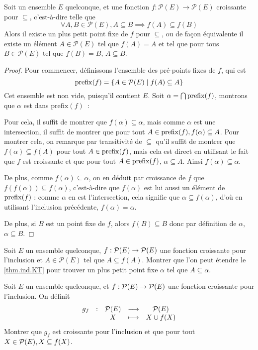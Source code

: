 \begin{theorem}\label{thm.ind.KT}
  Soit un ensemble $E$ quelconque, et une fonction
  $f : \mathcal P(E) \to \mathcal P(E)$ croissante pour $\subseteq$,
  c'est-à-dire telle que
  \[\forall A,B\in\mathcal P(E), A\subseteq B \implies f(A)\subseteq f(B)\]
  Alors il existe un plus petit point fixe de $f$ pour $\subseteq$, ou de façon
  équivalente il existe un élément $A\in \mathcal P(E)$ tel que $f(A)=A$ et tel
  que pour tous $B\in\mathcal P(E)$ tel que $f(B)=B$, $A\subseteq B$.
\end{theorem}
\begin{proof}
  Pour commencer, définissons l'ensemble des pré-points fixes de $f$, qui est
  \[\operatorname{prefix}(f) = \{ A \in \mathcal P(E)\mid f(A)\subseteq A\}\]
  Cet ensemble est non vide, puisqu'il contient $E$.
  Soit $\alpha = \bigcap \operatorname{prefix}(f)$, montrons que $\alpha$ est dans
  $\mathrm{prefix}(f)$~:

  Pour cela, il suffit de montrer que $f(\alpha)\subseteq \alpha$, mais comme
  $\alpha$ est une intersection, il suffit de montrer que pour tout
  $A\in\operatorname{prefix}(f), f(\alpha)\subseteq A$. Pour montrer cela, on
  remarque par transitivité de $\subseteq$ qu'il suffit de montrer que
  $f(\alpha)\subseteq f(A)$ pour tout $A\in \operatorname{prefix}(f)$, mais cela est
  direct en utilisant le fait que $f$ est croissante et que pour tout
  $A\in \operatorname{prefix}(f)$, $\alpha \subseteq A$. Ainsi
  $f(\alpha)\subseteq \alpha$.

  De plus, comme $f(\alpha)\subseteq \alpha$, on en déduit par croissance de
  $f$ que $f(f(\alpha))\subseteq f(\alpha)$, c'est-à-dire que $f(\alpha)$ est
  lui aussi un élément de $\operatorname{prefix}(f)$ : comme $\alpha$ en est l'intersection,
  cela signifie que $\alpha \subseteq f(\alpha)$, d'où en
  utilisant l'inclusion précédente, $f(\alpha) = \alpha$.

  De plus, si $B$ est un point fixe de $f$, alors $f(B)\subseteq B$ donc par
  définition de $\alpha$, $\alpha \subseteq B$.
\end{proof}

\begin{exercise}
  Soit $E$ un ensemble quelconque, $f : \mathcal{P}(E) \to \mathcal{P}(E)$ une
  fonction croissante pour l'inclusion et $A \in \mathcal P(E)$ tel que
  $A\subseteq f(A)$. Montrer que l'on peut étendre le \cref{thm.ind.KT} pour
  trouver un plus petit point fixe $\alpha$ tel que $A\subseteq \alpha$.
\end{exercise}

\begin{exercise}
  Soit $E$ un ensemble quelconque, et $f : \mathcal{P}(E) \to \mathcal{P}(E)$ une
  fonction croissante pour l'inclusion. On définit
  \[\begin{array}{ccccc}
    g_f & : & \mathcal{P}(E) & \longrightarrow & \mathcal{P}(E)\\
    & & X & \longmapsto & X \cup f(X)
  \end{array}\]
  Montrer que $g_f$ est croissante pour l'inclusion et que pour tout
  $X\in\mathcal{P}(E), X\subseteq f(X)$.
\end{exercise}

